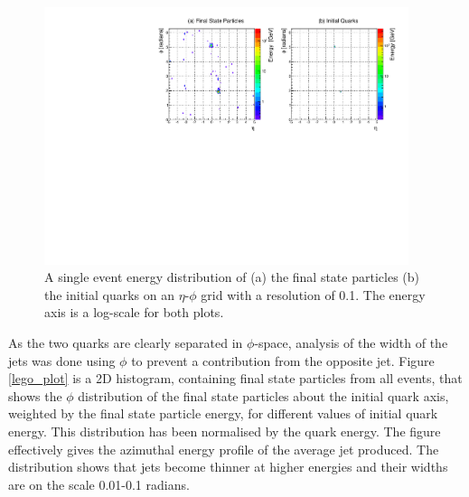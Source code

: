 \documentclass[a4paper,11pt, onecolumn]{article}
\begin{document}
  \vspace{-0.12cm}
  \begin{figure}[h]
    \begin{center}
      \includegraphics[width = 0.95\textwidth]{detector_quark}
      \caption{A single event energy distribution of (a) the final state particles (b) the initial quarks on an $\eta$-$\phi$ grid
           with a resolution of 0.1. The energy axis is a log-scale for both plots.}
      \label{detector_quark}
    \end{center}
  \end{figure}

  \vspace{-0.4cm}

  As the two quarks are clearly separated in $\phi$-space, analysis of the width of the jets was done using $\phi$ to prevent a contribution from the opposite jet. 
  Figure \ref{lego_plot} is a 2D histogram, containing final state particles from all events, that shows the $\phi$ distribution of the final state
  particles about the initial quark axis, weighted by the final state particle energy, for different values of initial quark energy. 
  This distribution has been normalised by the quark energy.
  The figure effectively gives the azimuthal energy profile of the average jet produced. The distribution shows that jets become thinner at higher energies and 
  their widths are on the scale 0.01-0.1 radians.
  
\end{document}
